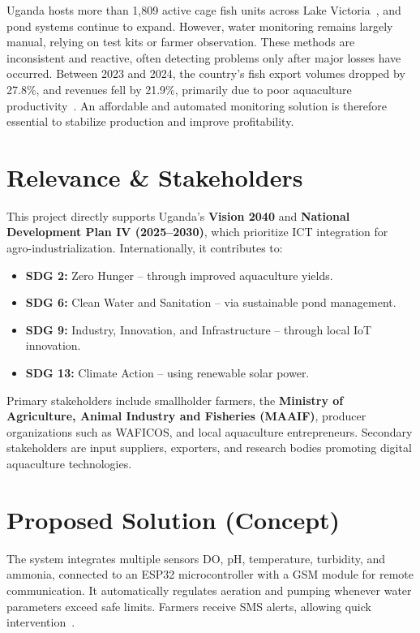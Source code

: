 \documentclass[12pt,a4paper]{article}
\begin{document}
Uganda hosts more than 1,809 active cage fish units across Lake Victoria~\cite{clough2020innovative}, and pond systems continue to expand. However, water monitoring remains largely manual, relying on test kits or farmer observation. These methods are inconsistent and reactive, often detecting problems only after major losses have occurred. Between 2023 and 2024, the country's fish export volumes dropped by 27.8\%, and revenues fell by 21.9\%, primarily due to poor aquaculture productivity~\cite{byabasaija2025unlocking}. An affordable and automated monitoring solution is therefore essential to stabilize production and improve profitability.

\section{Relevance \& Stakeholders}
This project directly supports Uganda's \textbf{Vision 2040} and \textbf{National Development Plan IV (2025–2030)}, which prioritize ICT integration for agro-industrialization. Internationally, it contributes to:
\begin{itemize}
    \item \textbf{SDG 2:} Zero Hunger – through improved aquaculture yields.
    \item \textbf{SDG 6:} Clean Water and Sanitation – via sustainable pond management.
    \item \textbf{SDG 9:} Industry, Innovation, and Infrastructure – through local IoT innovation.
    \item \textbf{SDG 13:} Climate Action – using renewable solar power.
\end{itemize}

Primary stakeholders include smallholder farmers, the \textbf{Ministry of Agriculture, Animal Industry and Fisheries (MAAIF)}, producer organizations such as WAFICOS, and local aquaculture entrepreneurs. Secondary stakeholders are input suppliers, exporters, and research bodies promoting digital aquaculture technologies.

\section{Proposed Solution (Concept)}
The system integrates multiple sensors DO, pH, temperature, turbidity, and ammonia, connected to an ESP32 microcontroller with a GSM module for remote communication. It automatically regulates aeration and pumping whenever water parameters exceed safe limits. Farmers receive SMS alerts, allowing quick intervention~\cite{jomsri2024prototype}.
\end{document}
